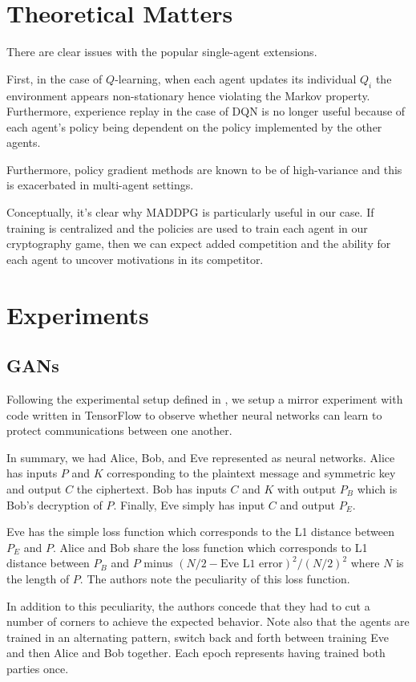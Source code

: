 \documentclass{llncs}
\begin{document}
\section{Theoretical Matters}

There are clear issues with the popular single-agent extensions. 

First, in the case of $Q$-learning, when each agent updates its individual $Q_i$ the environment appears non-stationary hence violating the Markov property. Furthermore, experience replay in the case of DQN is no longer useful because of each agent's policy being dependent on the policy implemented by the other agents.

Furthermore, policy gradient methods are known to be of high-variance and this is exacerbated in multi-agent settings\cite{lowe2017multi}.

Conceptually, it's clear why MADDPG is particularly useful in our case. If training is centralized and the policies are used to train each agent in our cryptography game, then we can expect added competition and the ability for each agent to uncover motivations in its competitor. 
\section{Experiments}

\subsection{GANs}

Following the experimental setup defined in \cite{abadi2016learning}, we setup a mirror experiment with code written in TensorFlow to observe whether neural networks can learn to protect communications between one another.

In summary, we had Alice, Bob, and Eve represented as neural networks. Alice has inputs $P$ and $K$ corresponding to the plaintext message and symmetric key and output $C$ the ciphertext. Bob has inputs $C$ and $K$ with output $P_B$ which is Bob's decryption of $P$. Finally, Eve simply has input $C$ and output $P_E$. 

Eve has the simple loss function which corresponds to the L1 distance between $P_E$ and $P$. Alice and Bob share the loss function which corresponds to L1 distance between $P_B$ and $P$ minus $(N/2 - \text{Eve L1 error})^2/(N/2)^2$ where $N$ is the length of $P$. The authors note the peculiarity of this loss function.

In addition to this peculiarity, the authors concede that they had to cut a number of corners to achieve the expected behavior. Note also that the agents are trained in an alternating pattern, switch back and forth between training Eve and then Alice and Bob together. Each epoch represents having trained both parties once. 
\end{document}
